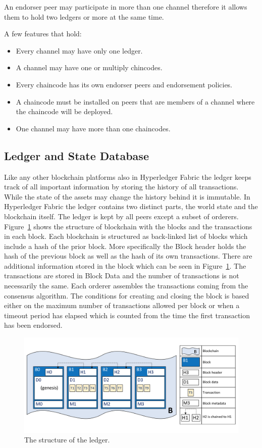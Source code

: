An endorser peer may participate in more than one channel therefore it allows them to hold two ledgers or more at the same time. 

A few features that hold: 
\begin{itemize}
  \item Every channel may have only one ledger.
  \item A channel may have one or multiply chincodes.
  \item Every chaincode has its own endorser peers and endorsement policies.
  \item A chaincode must be installed on peers that are members of a channel where the chaincode will be deployed. 
  \item One channel may have more than one chaincodes.
  \end{itemize}


\subsection{Ledger and State Database}

Like any other blockchain platforms also in Hyperledger Fabric the ledger keeps track of all important information by storing the history of all transactions. While the state of the assets may change the history behind it is immutable. In Hyperledger Fabric the ledger contains two distinct parts, the world state and the blockchain itself. 
The ledger is kept by all peers except a subset of orderers. 
Figure~\ref{fig:ledgerdiagram} shows the structure of blockchain with the blocks and the transactions in each block. Each blockchain is structured as back-linked list of blocks which include a hash of the prior block. More specifically the Block header holds the hash of the previous block as well as the hash of its own transactions. There are additional information stored in the block which can be seen in  Figure~\ref{fig:ledgerdiagram}. The transactions are stored in Block Data and the number of transactions is not necessarily the same. Each orderer assembles the transactions coming from the consensus algorithm. The conditions for creating and closing the block is based either on the maximum number of transactions allowed per block or when a timeout period has elapsed which is counted from the time the first transaction has been endorsed. 

\begin{figure}[!htb]
    \centering
    \includegraphics[width=1\textwidth]{figures/ledgediagram.png}
    \caption{The structure of the ledger.}
    \label{fig:ledgerdiagram}
\end{figure}

